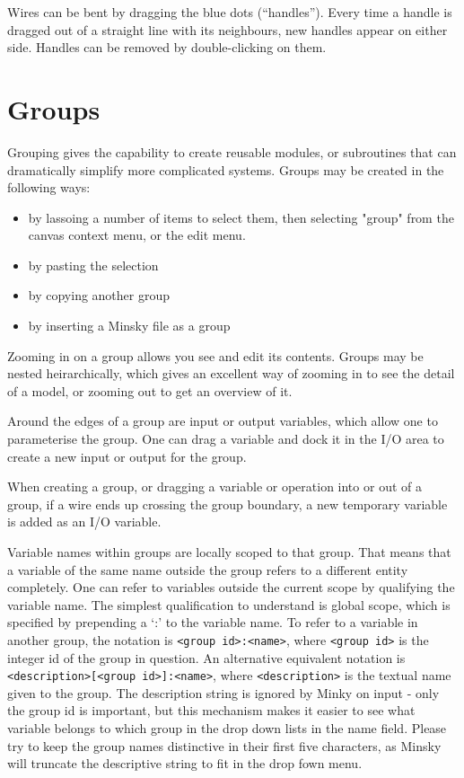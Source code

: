 Wires can be bent by dragging the blue dots (``handles''). Every time
a handle is dragged out of a straight line with its neighbours, new
handles appear on either side. Handles can be removed by
double-clicking on them.

\section{Groups}\label{group}

Grouping gives the capability to create reusable modules, or subroutines that
can dramatically simplify more complicated systems. Groups may be
created in the following ways:
\begin{itemize}
\item by lassoing a number of items to select them, then selecting
"group" from the canvas context menu, or the edit menu.
\item by pasting the selection
\item by copying another group
\item by inserting a Minsky file as a group
\end{itemize}

Zooming in on a group allows you see and edit its contents. Groups may
be nested heirarchically, which gives an excellent way of zooming in
to see the detail of a model, or zooming out to get an overview of it.

Around the edges of a group are input or output variables, which allow
one to parameterise the group. One can drag a variable and dock it in
the I/O area to create a new input or output for the group.

When creating a group, or dragging a variable or operation into or out
of a group, if a wire ends up crossing the group boundary, a new
temporary variable is added as an I/O variable.

Variable names within groups are locally scoped to that group. That
means that a variable of the same name outside the group refers to a
different entity completely. One can refer to variables outside the
current scope by qualifying the variable name. The simplest
qualification to understand is global scope, which is specified by
prepending a `:' to the variable name. To refer to a variable in
another group, the notation is \verb+<group id>:<name>+, where
\verb+<group id>+ is the integer id of the group in question. An
alternative equivalent notation is \verb+<description>[<group id>]:<name>+, where \verb+<description>+ is the textual name given to
the group. The description string is ignored by Minky on input - only
the group id is important, but this mechanism makes it easier to see
what variable belongs to which group in the drop down lists in the
name field. Please try to keep the group names distinctive in their
first five characters, as Minsky will truncate the descriptive string
to fit in the drop fown menu.

